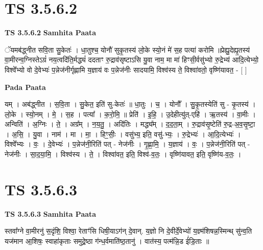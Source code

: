 \documentclass[17pt]{extarticle}
\begin{document}
\section*{ TS 3.5.6.2 }

\textbf{TS 3.5.6.2 } \newline
\textbf{Samhita Paata} \newline

ॅयमब॑द्ध्नीत सवि॒ता सु॒केतः॑ । धा॒तुश्च॒ योनौ॑ सुकृ॒तस्य॑ लो॒के स्यो॒नं मे॑ स॒ह पत्या॑ करोमि ॥प्रेह्यु॒देह्यृ॒तस्य॑ वा॒मीरन्व॒ग्निस्तेऽग्रं॑ नय॒त्वदि॑ति॒र्मद्ध्यं॑ ददताꣳ रु॒द्राव॑सृष्टाऽसि यु॒वा नाम॒ मा मा॑ हिꣳसी॒र्वसु॑भ्यो रु॒द्रेभ्य॑ आदि॒त्येभ्यो॒ विश्वे᳚भ्यो वो दे॒वेभ्यः॑ प॒न्नेज॑नीर्गृह्णामि य॒ज्ञाय॑ वः प॒न्नेज॑नीः सादयामि॒ विश्व॑स्य ते॒ विश्वा॑वतो॒ वृष्णि॑यावत॒ - [  ] \newline

\textbf{Pada Paata} \newline

यम् । अब॑द्ध्नीत । स॒वि॒ता । सु॒केत॒ इति॑ सु-केतः॑ ॥ धा॒तुः । च॒ । योनौ᳚ । सु॒कृ॒तस्येति॑ सु - कृ॒तस्य॑ । लो॒के । स्यो॒नम् । मे॒ । स॒ह । पत्या᳚ । क॒रो॒मि॒ ॥ प्रेति॑ । इ॒हि॒ । उ॒देहीत्यु॑त्-एहि॑ । ऋ॒तस्य॑ । वा॒मीः । अन्विति॑ । अ॒ग्निः । ते॒ । अग्र᳚म् । न॒य॒तु॒ । अदि॑तिः । मद्ध्य᳚म् । द॒द॒ता॒म् । रु॒द्राव॑सृ॒ष्टेति॑ रु॒द्र-अ॒व॒सृ॒ष्टा॒ । अ॒सि॒ । यु॒वा । नाम॑ । मा । मा॒ । हिꣳ॒॒सीः॒ । वसु॑भ्य॒ इति॒ वसु॑-भ्यः॒ । रु॒द्रेभ्यः॑ । आ॒दि॒त्येभ्यः॑ । विश्वे᳚भ्यः । वः॒ । दे॒वेभ्यः॑ । प॒न्नेज॑नी॒रिति॑ पत् - नेज॑नीः । गृ॒ह्णा॒मि॒ । य॒ज्ञाय॑ । वः॒ । प॒न्नेज॑नी॒रिति॑ पत् - नेज॑नीः । सा॒द॒या॒मि॒ । विश्व॑स्य । ते॒ । विश्वा॑वत॒ इति॒ विश्व॑-व॒तः॒ । वृष्णि॑यावत॒ इति॒ वृष्णि॑य-व॒तः॒ ।  \newline




\section*{ TS 3.5.6.3 }

\textbf{TS 3.5.6.3 } \newline
\textbf{Samhita Paata} \newline

स्तवा᳚ग्ने वा॒मीरनु॑ स॒दृंशि॒ विश्वा॒ रेताꣳ॑सि धिषी॒याऽग॑न् दे॒वान्. य॒ज्ञो नि दे॒वीर्दे॒वेभ्यो॑ य॒ज्ञ्म॑शिषन्न॒स्मिन्थ् सु॑न्व॒ति यज॑मान आ॒शिषः॒ स्वाहा॑कृताः समुद्रे॒ष्ठा ग॑न्ध॒र्वमाति॑ष्ठ॒तानु॑ । वात॑स्य॒ पत्म॑न्नि॒ड ई॑डि॒ताः ॥ \newline
\end{document}

